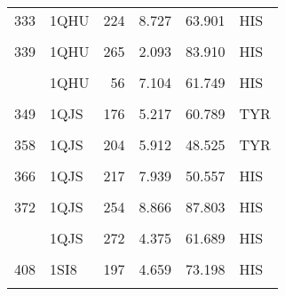 \begin{table}
\begin{tabular}{llrrrl}
			333 & 1QHU & 224 & 8.727 & 63.901 & HIS\\
			\cellcolor{gray!6}{337} & \cellcolor{gray!6}{1QHU} & \cellcolor{gray!6}{253} & \cellcolor{gray!6}{9.228} & \cellcolor{gray!6}{87.634} & \cellcolor{gray!6}{HIS}\\
			339 & 1QHU & 265 & 2.093 & 83.910 & HIS\\
			\cellcolor{gray!6}{343} & \cellcolor{gray!6}{1QHU} & \cellcolor{gray!6}{271} & \cellcolor{gray!6}{4.447} & \cellcolor{gray!6}{65.497} & \cellcolor{gray!6}{HIS}\\
			\addlinespace
			345 & 1QHU & 56 & 7.104 & 61.749 & HIS\\
			\cellcolor{gray!6}{348} & \cellcolor{gray!6}{1QJS} & \cellcolor{gray!6}{175} & \cellcolor{gray!6}{9.211} & \cellcolor{gray!6}{88.749} & \cellcolor{gray!6}{TYR}\\
			349 & 1QJS & 176 & 5.217 & 60.789 & TYR\\
			\cellcolor{gray!6}{355} & \cellcolor{gray!6}{1QJS} & \cellcolor{gray!6}{197} & \cellcolor{gray!6}{3.368} & \cellcolor{gray!6}{56.340} & \cellcolor{gray!6}{TYR}\\
			358 & 1QJS & 204 & 5.912 & 48.525 & TYR\\
			\addlinespace
			\cellcolor{gray!6}{362} & \cellcolor{gray!6}{1QJS} & \cellcolor{gray!6}{213} & \cellcolor{gray!6}{3.425} & \cellcolor{gray!6}{82.802} & \cellcolor{gray!6}{HIS}\\
			366 & 1QJS & 217 & 7.939 & 50.557 & HIS\\
			\cellcolor{gray!6}{368} & \cellcolor{gray!6}{1QJS} & \cellcolor{gray!6}{225} & \cellcolor{gray!6}{8.182} & \cellcolor{gray!6}{81.298} & \cellcolor{gray!6}{HIS}\\
			372 & 1QJS & 254 & 8.866 & 87.803 & HIS\\
			\cellcolor{gray!6}{374} & \cellcolor{gray!6}{1QJS} & \cellcolor{gray!6}{266} & \cellcolor{gray!6}{2.146} & \cellcolor{gray!6}{82.026} & \cellcolor{gray!6}{HIS}\\
			\addlinespace
			378 & 1QJS & 272 & 4.375 & 61.689 & HIS\\
			\cellcolor{gray!6}{380} & \cellcolor{gray!6}{1QJS} & \cellcolor{gray!6}{56} & \cellcolor{gray!6}{6.112} & \cellcolor{gray!6}{65.715} & \cellcolor{gray!6}{HIS}\\
			408 & 1SI8 & 197 & 4.659 & 73.198 & HIS\\
			\cellcolor{gray!6}{423} & \cellcolor{gray!6}{1SI8} & \cellcolor{gray!6}{337} & \cellcolor{gray!6}{2.133} & \cellcolor{gray!6}{58.339} & \cellcolor{gray!6}{TYR}\\

\end{tabular}
\end{table}
